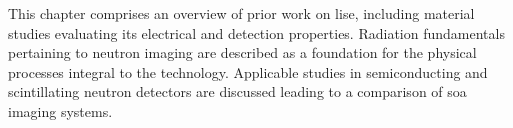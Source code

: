 \documentclass[../../main.tex]{subfiles}
\begin{document}
%
    \Xsection%
    This chapter comprises an overview of prior work on \gls{lise}, including material studies evaluating its electrical and detection properties.
    Radiation fundamentals pertaining to neutron imaging are described as a foundation for the physical processes integral to the technology.
    Applicable studies in semiconducting and scintillating neutron detectors are discussed leading to a comparison of \gls{soa} imaging systems.
\end{document}
